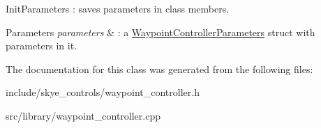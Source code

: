 Init\-Parameters \-: saves parameters in class members. 


\begin{DoxyParams}{Parameters}
{\em parameters} & \-: a \hyperlink{struct_waypoint_controller_parameters}{Waypoint\-Controller\-Parameters} struct with parameters in it. \\
\hline
\end{DoxyParams}


The documentation for this class was generated from the following files\-:\begin{DoxyCompactItemize}
\item 
include/skye\-\_\-controls/waypoint\-\_\-controller.\-h\item 
src/library/waypoint\-\_\-controller.\-cpp\end{DoxyCompactItemize}
